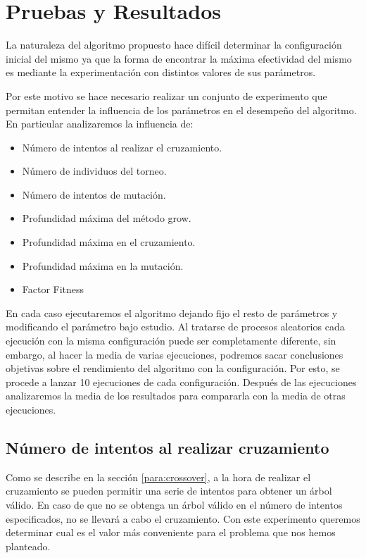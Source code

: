 \chapter{Pruebas y Resultados}\label{ch:pruebasyresultados}

La naturaleza del algoritmo propuesto hace difícil determinar la configuración
inicial del mismo ya que la forma de encontrar la máxima efectividad del mismo es
mediante la experimentación con distintos valores de sus parámetros.

Por este motivo se hace necesario realizar un conjunto de experimento que
permitan entender la influencia de los parámetros en el desempeño del algoritmo.
En particular analizaremos la influencia de:

\begin{itemize}
  \item Número de intentos al realizar el cruzamiento.
  \item Número de individuos del torneo.
  \item Número de intentos de mutación.
  \item Profundidad máxima del método grow.
  \item Profundidad máxima en el cruzamiento.
  \item Profundidad máxima en la mutación.
  \item Factor Fitness
\end{itemize}
 

En cada caso ejecutaremos el algoritmo dejando fijo el resto de parámetros y
modificando el parámetro bajo estudio. Al tratarse de procesos aleatorios cada
ejecución con la misma configuración puede ser completamente diferente, sin
embargo, al hacer la media de varias ejecuciones, podremos sacar conclusiones
objetivas sobre el rendimiento del algoritmo con la configuración. Por esto, se
procede a lanzar 10 ejecuciones de cada configuración. Después  de las
ejecuciones analizaremos la media de los resultados para compararla con la media
de otras ejecuciones.

\section{Número de intentos al realizar
cruzamiento}\label{sec:p-intentos-cruzamiento}

Como se describe en la sección \ref{para:crossover}, a la hora de realizar el
cruzamiento se pueden permitir una serie de intentos para obtener un árbol
válido. En caso de que no se obtenga un árbol válido en el número de intentos
especificados, no se llevará a cabo el cruzamiento. Con este experimento queremos
determinar cual es el valor más conveniente para el problema que nos hemos
planteado.

